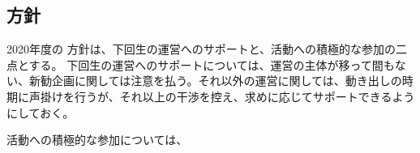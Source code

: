 \subsection*{\newGradeIfKouki{}\thirdGrade{}方針}



2020年度の \newGradeIfKouki{}\thirdGrade{}方針は、下回生の運営へのサポートと、活動への積極的な参加の二点とする。
下回生の運営へのサポートについては、運営の主体が移って間もない、新勧企画に関しては注意を払う。それ以外の運営に関しては、動き出しの時期に声掛けを行うが、それ以上の干渉を控え、求めに応じてサポートできるようにしておく。

活動への積極的な参加については、
